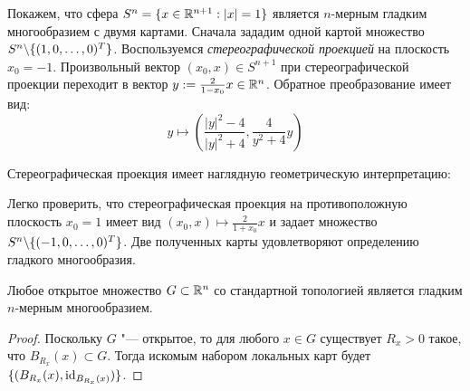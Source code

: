\begin{example}
	Покажем, что сфера $S^n = \{x \in \mathbb{R}^{n+1} : |x| = 1\}$ является $n$-мерным гладким многообразием с двумя картами. Сначала зададим одной картой множество $S^n \backslash \{(1, 0, \dotsc, 0)^T\}$. Воспользуемся \textit{стереографической проекцией} на плоскость $x_0 = -1$. Произвольный вектор $(x_0, x) \in S^{n+1}$ при стереографической проекции переходит в вектор $y := \frac{2}{1-x_0}x \in \mathbb{R}^n$. Обратное преобразование имеет вид:
	\[y \mapsto \left(\frac{|y|^2 - 4}{|y|^2 + 4}, \frac{4}{y^2 + 4}y\right)\]
	
	Стереографическая проекция имеет наглядную геометрическую интерпретацию:
	\begin{center}
	\end{center}
	
	Легко проверить, что стереографическая проекция на противоположную плоскость $x_0 = 1$ имеет вид $(x_0, x) \mapsto \frac2{1+x_0}x$ и задает множество $S^n \backslash \{(-1, 0, \dotsc, 0)^T\}$. Две полученных карты удовлетворяют определению гладкого многообразия.
\end{example}

\begin{proposition}
	Любое открытое множество $G \subset \mathbb{R}^n$ со стандартной топологией является гладким $n$-мерным многообразием.
\end{proposition}

\begin{proof}
	Поскольку $G$ "--- открытое, то для любого $x \in G$ существует $R_x > 0$ такое, что $B_{R_x}(x) \subset G$. Тогда искомым набором локальных карт будет $\{(B_{R_x}(x), \mathrm{id}_{B_{R_x}(x)})\}$.
\end{proof}

